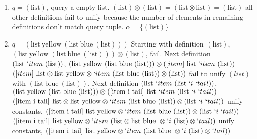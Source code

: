 \documentclass[11pt,a4paper]{report}
\newcommand{\var}[1]{`#1}
\newcommand{\unify}{\otimes}
\begin{document}
\begin{enumerate}
\item $q = (\text{list})$, query a empty list.
\subitem $(\text{list}) \unify (\text{list}) = (\text{list} \unify \text{list}) = (\text{list})$
\subitem all other definitions fail to unify because the number of elements in remaining definitions don't match query tuple.
\subitem $\alpha = \{(\text{list})\}$
\item $q = (\text{list}\ \text{yellow}\ (\text{list}\ \text{blue}\ (\text{list})))$
\subitem Starting with definition $(\text{list})$,
\subitem $(\text{list}\ \text{yellow}\ (\text{list}\ \text{blue}\ (\text{list}))) \unify (\text{list})$, fail.
\subitem Next definition $(\text{list}\ \var{item}\ (\text{list}))$,
\subitem $(\text{list}\ \text{yellow}\ (\text{list}\ \text{blue}\ (\text{list}))) \unify ([item]\ \text{list}\ \var{item}\ (\text{list}))$
\subitem $([item]\ \text{list} \unify \text{list}\ \text{yellow} \unify \var{item}\ (\text{list}\ \text{blue}\ (\text{list})) \unify (\text{list}))$
\subitem fail to unify $(list)$ with $(\text{list}\ \text{blue}\ (\text{list}))$.
\subitem Next definition $(\text{list}\ \var{item}\ (\text{list}\ \var{i}\ \var{tail}))$,
\subitem $(\text{list}\ \text{yellow}\ (\text{list}\ \text{blue}\ (\text{list}))) \unify ([\text{item}\ \text{i}\ \text{tail}]\ \text{list}\ \var{item}\ (\text{list}\ \var{i}\ \var{tail}))$
\subitem $([\text{item}\ \text{i}\ \text{tail}]\ \text{list}\unify \text{list}\ \text{yellow} \unify \var{item}\ (\text{list}\ \text{blue}\ (\text{list})) \unify (\text{list}\ \var{i}\ \var{tail}))$
\subitem unify constants,
\subitem $([\text{item}\ \text{i}\ \text{tail}]\ \text{list}\ \text{yellow} \unify \var{item}\ (\text{list}\ \text{blue}\ (\text{list})) \unify (\text{list}\ \var{i}\ \var{tail}))$
\subitem $([\text{item}\ \text{i}\ \text{tail}]\ \text{list}\ \text{yellow} \unify \var{item}\ (\text{list} \unify \text{list}\ \text{blue}\ \unify \var{i}\ (\text{list}) \unify \var{tail}))$
\subitem unify constants,
\subitem $([\text{item}\ \text{i}\ \text{tail}]\ \text{list}\ \text{yellow} \unify \var{item}\ (\text{list}\ \text{blue}\ \unify \var{i}\ (\text{list}) \unify \var{tail}))$


\end{enumerate}
\end{document}
